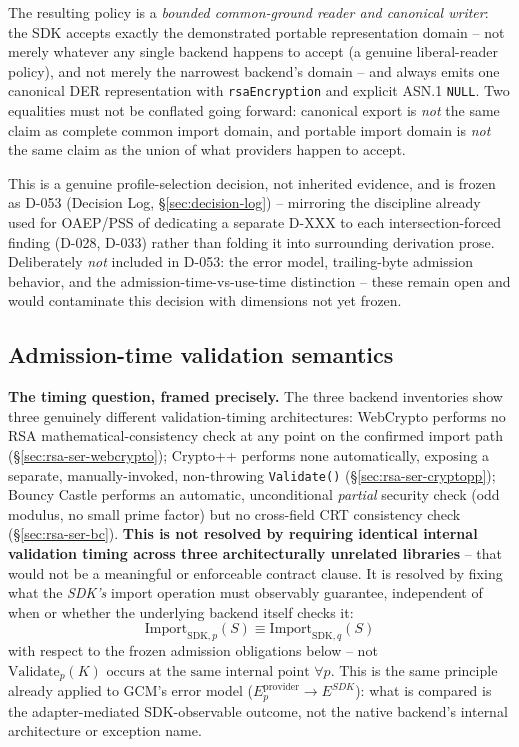 \documentclass[11pt,a4paper]{article}
\begin{document}
The resulting policy is a \emph{bounded common-ground reader and
canonical writer}: the SDK accepts exactly the demonstrated portable
representation domain -- not merely whatever any single backend
happens to accept (a genuine liberal-reader policy), and not merely
the narrowest backend's domain -- and always emits one canonical DER
representation with \texttt{rsaEncryption} and explicit ASN.1
\texttt{NULL}. Two equalities must not be conflated going forward:
canonical export is \emph{not} the same claim as complete common
import domain, and portable import domain is \emph{not} the same
claim as the union of what providers happen to accept.

This is a genuine profile-selection decision, not inherited evidence, and is frozen as D-053 (Decision Log, \S\ref{sec:decision-log}) -- mirroring the discipline already used for OAEP/PSS of dedicating a separate D-XXX to each intersection-forced finding (D-028, D-033) rather than folding it into surrounding derivation prose. Deliberately \emph{not} included in D-053: the error model, trailing-byte admission behavior, and the admission-time-vs-use-time distinction -- these remain open and would contaminate this decision with dimensions not yet frozen.

\subsection{Admission-time validation semantics}\label{sec:rsa-ser-admission}

\textbf{The timing question, framed precisely.} The three backend inventories show three genuinely different validation-timing architectures: WebCrypto performs no RSA mathematical-consistency check at any point on the confirmed import path (\S\ref{sec:rsa-ser-webcrypto}); Crypto++ performs none automatically, exposing a separate, manually-invoked, non-throwing \texttt{Validate()} (\S\ref{sec:rsa-ser-cryptopp}); Bouncy Castle performs an automatic, unconditional \emph{partial} security check (odd modulus, no small prime factor) but no cross-field CRT consistency check (\S\ref{sec:rsa-ser-bc}). \textbf{This is not resolved by requiring identical internal validation timing across three architecturally unrelated libraries} -- that would not be a meaningful or enforceable contract clause. It is resolved by fixing what the \emph{SDK's} import operation must observably guarantee, independent of when or whether the underlying backend itself checks it:
\[
\text{Import}_{\mathrm{SDK},p}(S) \equiv \text{Import}_{\mathrm{SDK},q}(S)
\]
with respect to the frozen admission obligations below -- not
$\text{Validate}_p(K) \text{ occurs at the same internal point } \forall p$.
This is the same principle already applied to GCM's error model ($E_p^{\text{provider}} \to E^{SDK}$): what is compared is the adapter-mediated SDK-observable outcome, not the native backend's internal architecture or exception name.
\end{document}

